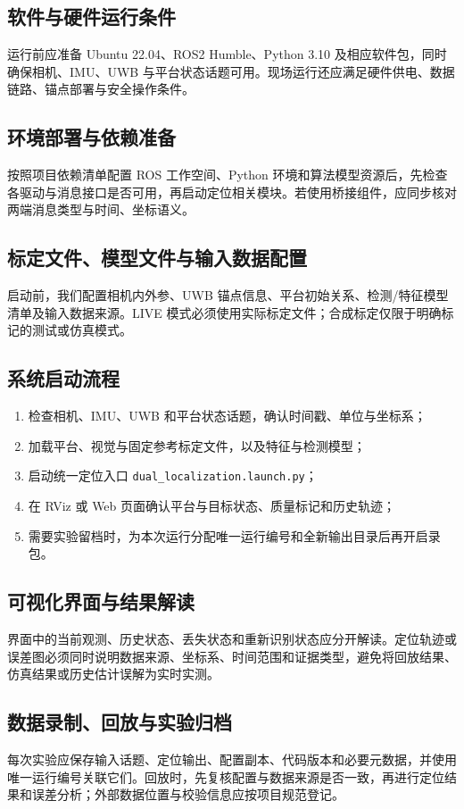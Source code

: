 \documentclass[UTF8,a4paper,12pt]{ctexart}
\begin{document}
\subsection{软件与硬件运行条件}
运行前应准备 Ubuntu 22.04、ROS2 Humble、Python 3.10 及相应软件包，同时确保相机、IMU、UWB 与平台状态话题可用。现场运行还应满足硬件供电、数据链路、锚点部署与安全操作条件。

\subsection{环境部署与依赖准备}
按照项目依赖清单配置 ROS 工作空间、Python 环境和算法模型资源后，先检查各驱动与消息接口是否可用，再启动定位相关模块。若使用桥接组件，应同步核对两端消息类型与时间、坐标语义。

\subsection{标定文件、模型文件与输入数据配置}
启动前，我们配置相机内外参、UWB 锚点信息、平台初始关系、检测/特征模型清单及输入数据来源。LIVE 模式必须使用实际标定文件；合成标定仅限于明确标记的测试或仿真模式。

\subsection{系统启动流程}
\begin{enumerate}
  \item 检查相机、IMU、UWB 和平台状态话题，确认时间戳、单位与坐标系；
  \item 加载平台、视觉与固定参考标定文件，以及特征与检测模型；
  \item 启动统一定位入口 \texttt{dual\_localization.launch.py}；
  \item 在 RViz 或 Web 页面确认平台与目标状态、质量标记和历史轨迹；
  \item 需要实验留档时，为本次运行分配唯一运行编号和全新输出目录后再开启录包。
\end{enumerate}

\subsection{可视化界面与结果解读}
界面中的当前观测、历史状态、丢失状态和重新识别状态应分开解读。定位轨迹或误差图必须同时说明数据来源、坐标系、时间范围和证据类型，避免将回放结果、仿真结果或历史估计误解为实时实测。

\subsection{数据录制、回放与实验归档}
每次实验应保存输入话题、定位输出、配置副本、代码版本和必要元数据，并使用唯一运行编号关联它们。回放时，先复核配置与数据来源是否一致，再进行定位结果和误差分析；外部数据位置与校验信息应按项目规范登记。
\end{document}
